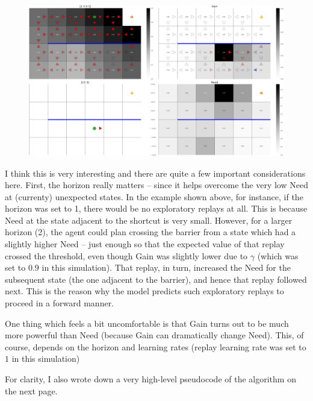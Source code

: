 \documentclass{article}
\begin{document}
\begin{figure}[ht!]
    \centering
    \includegraphics[width=1\textwidth]{../../../data/plots/move_3001_5.png}
\end{figure}

\clearpage

I think this is very interesting and there are quite a few important considerations here. First, the horizon really 
matters -- since it helps overcome the very low Need at (currenty) unexpected states. In the example shown above, 
for instance, if the horizon was set to 1, there would be no exploratory replays at all. This is because Need at the 
state adjacent to the shortcut is very small. However, for a larger horizon (2), the agent could plan crossing the 
barrier from a state which had a slightly higher Need -- just enough so that the expected value of that replay crossed 
the threshold, even though Gain was slightly lower due to $\gamma$ (which was set to $0.9$ in this simulation). That replay, in turn, 
increased the Need for the subsequent state (the one adjacent to the barrier), and hence that replay followed next. This 
is the reason why the model predicts such exploratory replays to proceed in a forward manner. 

\bigbreak

One thing which feels a bit uncomfortable is that Gain turns out to be much more powerful than Need (because Gain can dramatically change 
Need). This, of course, depends on the horizon and learning rates (replay learning rate was set to $1$ in this simulation)

\bigbreak

For clarity, I also wrote down a very high-level pseudocode of the algorithm on the next page.

\newpage
\end{document}
